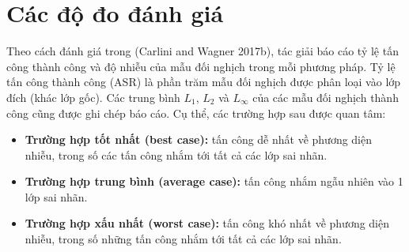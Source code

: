 \section{Các độ đo đánh giá}
Theo cách đánh giá trong (Carlini and Wagner 2017b), tác giải báo cáo tỷ lệ tấn công thành công và độ nhiễu của mẫu đối nghịch trong mỗi phương pháp. Tỷ lệ tấn công thành công (ASR) là phần trăm mẫu đối nghịch được phân loại vào lớp đích (khác lớp gốc). Các trung bình $L_1$, $L_2$ và $L_{\infty}$ của các mẫu đối nghịch thành công cũng được ghi chép báo cáo. Cụ thể, các trường hợp sau được quan tâm:
\begin{itemize}
    \item \textbf{Trường hợp tốt nhất (best case):} tấn công dễ nhất về phương diện nhiễu, trong số các tấn công nhắm tới tất cả các lớp sai nhãn.
    \item \textbf{Trường hợp trung bình (average case):} tấn công nhắm ngẫu nhiên vào 1 lớp sai nhãn.
    \item \textbf{Trường hợp xấu nhất (worst case):} tấn công khó nhất về phương diện nhiễu, trong số những tấn công nhắm tới tất cả các lớp sai nhãn.
\end{itemize}